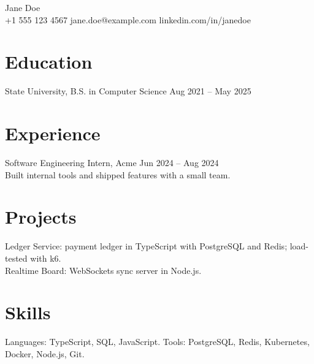 \documentclass[10pt]{article}
\begin{document}
\begin{center}{\Large Jane Doe}\\ +1 555 123 4567 \quad jane.doe@example.com \quad linkedin.com/in/janedoe\end{center}
\section*{Education}
State University, B.S. in Computer Science \hfill Aug 2021 -- May 2025
\section*{Experience}
Software Engineering Intern, Acme \hfill Jun 2024 -- Aug 2024\\
Built internal tools and shipped features with a small team.
\section*{Projects}
Ledger Service: payment ledger in TypeScript with PostgreSQL and Redis; load-tested with k6.\\
Realtime Board: WebSockets sync server in Node.js.
\section*{Skills}
Languages: TypeScript, SQL, JavaScript. Tools: PostgreSQL, Redis, Kubernetes, Docker, Node.js, Git.
\end{document}
